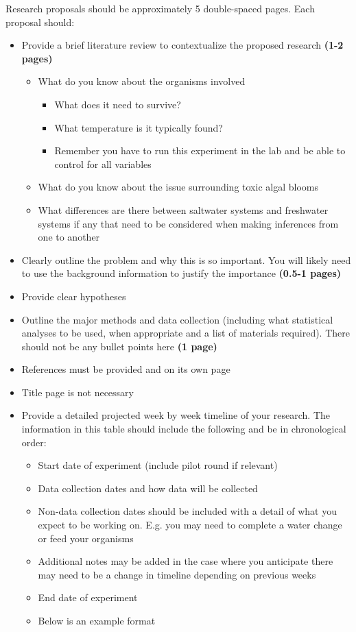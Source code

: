 \documentclass[
]{book}
\providecommand{\tightlist}{%
  \setlength{\itemsep}{0pt}\setlength{\parskip}{0pt}}
\begin{document}
Research proposals should be approximately 5 double-spaced pages. Each proposal should:

\begin{itemize}
\tightlist
\item
  Provide a brief literature review to contextualize the proposed research \textbf{(1-2 pages)}

  \begin{itemize}
  \tightlist
  \item
    What do you know about the organisms involved

    \begin{itemize}
    \tightlist
    \item
      What does it need to survive?
    \item
      What temperature is it typically found?
    \item
      Remember you have to run this experiment in the lab and be able to control for all variables
    \end{itemize}
  \item
    What do you know about the issue surrounding toxic algal blooms
  \item
    What differences are there between saltwater systems and freshwater systems if any that need to be considered when making inferences from one to another
  \end{itemize}
\item
  Clearly outline the problem and why this is so important. You will likely need to use the background information to justify the importance \textbf{(0.5-1 pages)}
\item
  Provide clear hypotheses
\item
  Outline the major methods and data collection (including what statistical analyses to be used, when appropriate and a list of materials required). There should not be any bullet points here \textbf{(1 page)}
\item
  References must be provided and on its own page
\item
  Title page is not necessary
\item
  Provide a detailed projected week by week timeline of your research. The information in this table should include the following and be in chronological order:

  \begin{itemize}
  \tightlist
  \item
    Start date of experiment (include pilot round if relevant)
  \item
    Data collection dates and how data will be collected
  \item
    Non-data collection dates should be included with a detail of what you expect to be working on. E.g. you may need to complete a water change or feed your organisms
  \item
    Additional notes may be added in the case where you anticipate there may need to be a change in timeline depending on previous weeks
  \item
    End date of experiment
  \item
    Below is an example format
  \end{itemize}
\end{itemize}
\end{document}
